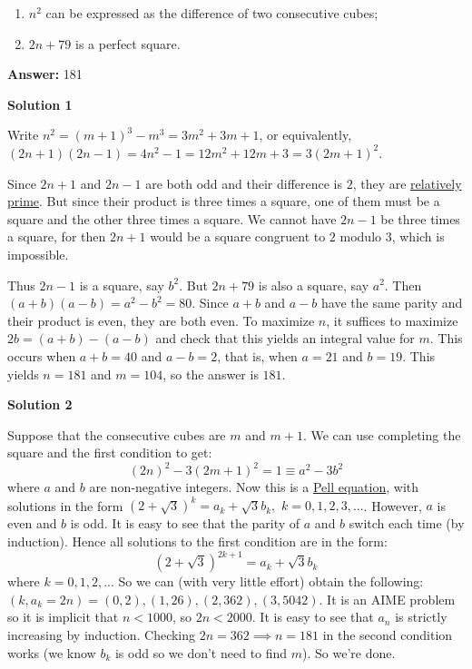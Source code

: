 \begin{enumerate}
 
            \begin{enumerate}[label=(\roman*)]
                \item  $n^2$ can be expressed as the difference of two consecutive cubes;
\item  $2n + 79$ is a perfect square.
            \end{enumerate}
            
 \textbf{Answer: }181



\textbf{Solution 1}

Write $n^2 = (m + 1)^3 - m^3 = 3m^2 + 3m + 1$, or equivalently, $(2n + 1)(2n - 1) = 4n^2 - 1 = 12m^2 + 12m + 3 = 3(2m + 1)^2$.

 Since $2n + 1$ and $2n - 1$ are both odd and their difference is $2$, they are \href{https://artofproblemsolving.com/wiki/index.php?title=Relatively\_prime}{relatively prime}. But since their product is three times a square, one of them must be a square and the other three times a square. We cannot have $2n - 1$ be three times a square, for then $2n + 1$ would be a square congruent to $2$ modulo $3$, which is impossible.

 Thus $2n - 1$ is a square, say $b^2$. But $2n + 79$ is also a square, say $a^2$. Then $(a + b)(a - b) = a^2 - b^2 = 80$. Since $a + b$ and $a - b$ have the same parity and their product is even, they are both even. To maximize $n$, it suffices to maximize $2b = (a + b) - (a - b)$ and check that this yields an integral value for $m$. This occurs when $a + b = 40$ and $a - b = 2$, that is, when $a = 21$ and $b = 19$. This yields $n = 181$ and $m = 104$, so the answer is $\boxed{181}$.

 



\textbf{Solution 2}

Suppose that the consecutive cubes are $m$ and $m + 1$. We can use completing the square and the first condition to get:
 \[(2n)^2 - 3(2m + 1)^2 = 1\equiv a^2 - 3b^2\]where $a$ and $b$ are non-negative integers. Now this is a \href{https://artofproblemsolving.com/wiki/index.php?title=Pell\_equation}{Pell equation}, with solutions in the form $(2 + \sqrt {3})^k = a_k + \sqrt {3}b_k,$ $k = 0,1,2,3,...$. However, $a$ is even and $b$ is odd. It is easy to see that the parity of $a$ and $b$ switch each time (by induction). Hence all solutions to the first condition are in the form:
 \[(2 + \sqrt {3})^{2k + 1} = a_k + \sqrt {3}b_k\]where $k = 0,1,2,..$. So we can (with very little effort) obtain the following: $(k,a_k = 2n) = (0,2),(1,26),(2,362),(3,5042)$. It is an AIME problem so it is implicit that $n < 1000$, so $2n < 2000$. It is easy to see that $a_n$ is strictly increasing by induction. Checking $2n = 362\implies n =\boxed{181}$ in the second condition works (we know $b_k$ is odd so we don't need to find $m$). So we're done.


\end{enumerate}
